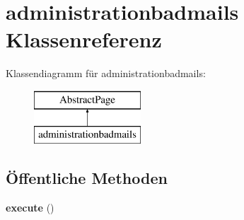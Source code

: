 \hypertarget{classadministrationbadmails}{}\section{administrationbadmails Klassenreferenz}
\label{classadministrationbadmails}
Klassendiagramm für administrationbadmails\+:\begin{figure}[H]
\begin{center}
\leavevmode
\includegraphics[height=2.000000cm]{classadministrationbadmails}
\end{center}
\end{figure}
\subsection*{Öffentliche Methoden}
\begin{DoxyCompactItemize}
\item 
\mbox{\label{classadministrationbadmails_acb9be79108c99e36b0c547c1a7c3cfa2}} 
{\bfseries execute} ()
\end{DoxyCompactItemize}
